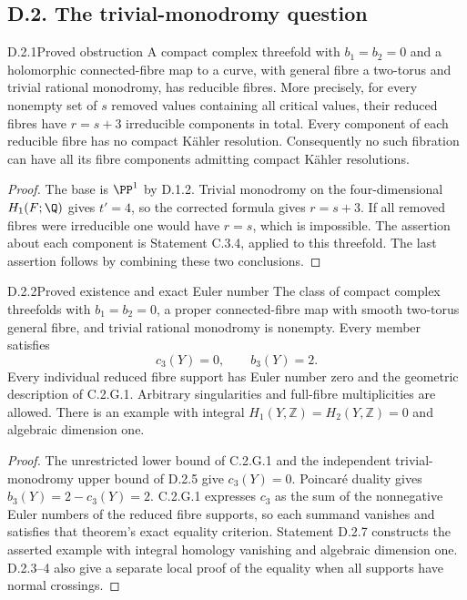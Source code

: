 \subsection{D.2. The trivial-monodromy question}


\begin{idstatement}{D.2.1}{Proved obstruction}\label{st:D.2.1}
A compact complex threefold with $b_1=b_2=0$ and a holomorphic
connected-fibre map to a curve, with general fibre a two-torus and
trivial rational monodromy, has reducible fibres. More precisely,
for every nonempty set of $s$ removed values containing all critical
values, their reduced fibres have $r=s+3$ irreducible components in
total. Every component of each reducible fibre has no compact
K\"ahler resolution. Consequently no such fibration can have all
its fibre components admitting compact K\"ahler resolutions.
\end{idstatement}
\begin{proof}
The base is $\PP^1$ by D.1.2. Trivial monodromy on the
four-dimensional $H_1(F;\Q)$ gives $t'=4$, so the corrected formula
gives $r=s+3$. If all removed fibres were irreducible one would have
$r=s$, which is impossible. The assertion about each component is
Statement C.3.4, applied to this threefold. The last assertion follows
by combining these two conclusions.
\end{proof}



\begin{idstatement}{D.2.2}{Proved existence and exact Euler number}\label{st:D.2.2}
The class of compact complex threefolds with $b_1=b_2=0$,
a proper connected-fibre map with smooth two-torus general fibre,
and trivial rational monodromy is nonempty. Every member satisfies
\[
                   c_3(Y)=0,\qquad b_3(Y)=2.
\]
Every individual reduced fibre support has Euler number zero and
the geometric description of C.2.G.1. Arbitrary singularities and
full-fibre multiplicities are allowed. There is an example with
integral $H_1(Y,\mathbb Z)=H_2(Y,\mathbb Z)=0$ and
algebraic dimension one.
\end{idstatement}
\begin{proof}
The unrestricted lower bound of C.2.G.1 and the independent
trivial-monodromy upper bound of D.2.5 give $c_3(Y)=0$.
Poincar\'e duality gives $b_3(Y)=2-c_3(Y)=2$.
C.2.G.1 expresses $c_3$ as the sum of the nonnegative
Euler numbers of the reduced fibre supports, so each summand
vanishes and satisfies that theorem's exact equality criterion.
Statement D.2.7 constructs the asserted example with integral
homology vanishing and algebraic dimension one. D.2.3--4 also
give a separate local proof of the equality when all supports
have normal crossings.
\end{proof}


